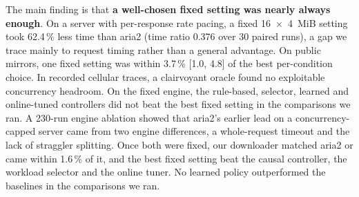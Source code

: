 The main finding is that \textbf{a well-chosen fixed setting was nearly always enough}. On a server with per-response rate pacing, a fixed 16~$\times$~4~MiB setting took 62.4\,\% less time than aria2 (time ratio 0.376 over 30 paired runs), a gap we trace mainly to request timing rather than a general advantage. On public mirrors, one fixed setting was within 3.7\,\% [1.0, 4.8] of the best per-condition choice. In recorded cellular traces, a clairvoyant oracle found no exploitable concurrency headroom. On the fixed engine, the rule-based, selector, learned and online-tuned controllers did not beat the best fixed setting in the comparisons we ran. A 230-run engine ablation showed that aria2's earlier lead on a concurrency-capped server came from two engine differences, a whole-request timeout and the lack of straggler splitting. Once both were fixed, our downloader matched aria2 or came within 1.6\,\% of it, and the best fixed setting beat the causal controller, the workload selector and the online tuner. No learned policy outperformed the baselines in the comparisons we ran.

